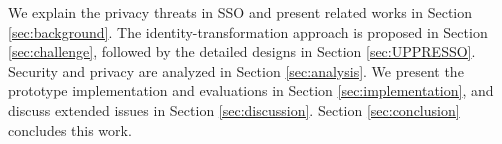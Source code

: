 We explain the privacy threats in SSO and present related works in Section \ref{sec:background}.
The identity-transformation approach is proposed in Section \ref{sec:challenge}, followed by the detailed designs in Section \ref{sec:UPPRESSO}.
Security and privacy are analyzed in Section \ref{sec:analysis}.
We present the prototype implementation and evaluations in Section \ref{sec:implementation}, and discuss extended issues in Section \ref{sec:discussion}. Section \ref{sec:conclusion} concludes this work.
